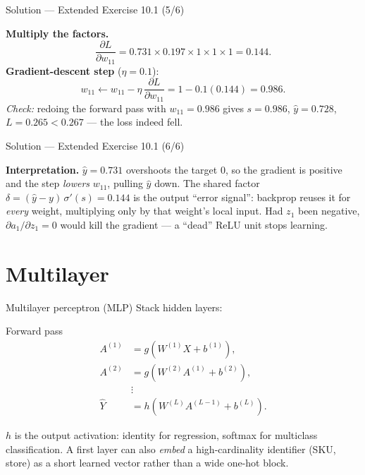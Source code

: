 \documentclass[aspectratio=169,11pt]{beamer}
\begin{document}
\begin{frame}{Solution --- Extended Exercise 10.1 (5/6)}
\begin{solutionbox}
  \textbf{Multiply the factors.}
  \[
    \frac{\partial L}{\partial w_{11}}
      =0.731\times0.197\times1\times1\times1=0.144 .
  \]
  \textbf{Gradient-descent step} ($\eta=0.1$):
  \[
    w_{11}\leftarrow w_{11}-\eta\,\frac{\partial L}{\partial w_{11}}
      =1-0.1(0.144)=0.986 .
  \]
  \emph{Check:} redoing the forward pass with $w_{11}=0.986$ gives
  $s=0.986$, $\hat y=0.728$, $L=0.265<0.267$ --- the loss indeed fell.

  \smallskip
\end{solutionbox}
\end{frame}

\begin{frame}{Solution --- Extended Exercise 10.1 (6/6)}
\begin{solutionbox}
  \textbf{Interpretation.} $\hat y=0.731$ overshoots the target $0$, so the gradient is
  positive and the step \emph{lowers} $w_{11}$, pulling $\hat y$ down. The shared factor
  $\delta=(\hat y-y)\,\sigma'(s)=0.144$ is the output ``error signal'': backprop reuses it
  for \emph{every} weight, multiplying only by that weight's local input. Had $z_1$ been
  negative, $\partial a_1/\partial z_1=0$ would kill the gradient --- a ``dead'' ReLU unit
  stops learning.
\end{solutionbox}
\end{frame}

\section{Multilayer}

\begin{frame}{Multilayer perceptron (MLP)}
  Stack hidden layers:
  \begin{block}{Forward pass}
    \begin{align*}
      A^{(1)} &= g(W^{(1)} X + b^{(1)}), \\
      A^{(2)} &= g(W^{(2)} A^{(1)} + b^{(2)}), \\
              &\vdots \\
      \hat Y  &= h(W^{(L)} A^{(L-1)} + b^{(L)}).
    \end{align*}
  \end{block}
  \begin{readme}
    $h$ is the output activation: identity for regression, softmax for multiclass
    classification. A first layer can also \emph{embed} a high-cardinality identifier
    (SKU, store) as a short learned vector rather than a wide one-hot block.
  \end{readme}
\end{frame}
\end{document}
